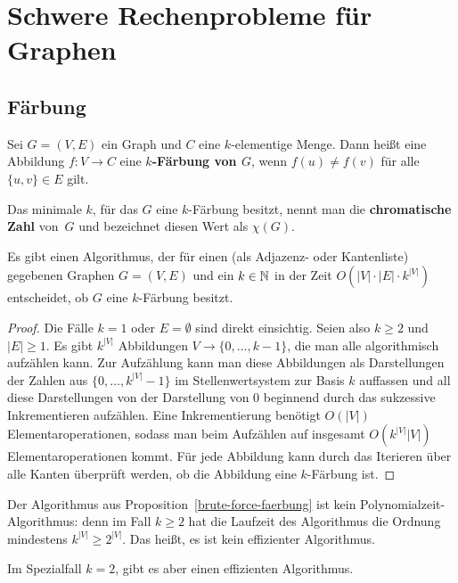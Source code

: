 \section{Schwere Rechenprobleme für Graphen} 

\subsection{Färbung} 

\begin{defn}
	Sei $G = (V,E)$ ein Graph und $C$ eine $k$-elementige Menge.
	Dann heißt eine Abbildung $ f : V\to C$ eine \textbf{$k$-Färbung von $G$}, wenn $f(u) \ne f(v)$ für alle $\{u,v\} \in E$ gilt. 
	
	Das minimale $k$, für das $G$ eine $k$-Färbung besitzt, nennt man die \textbf{chromatische Zahl} von~$G$ und bezeichnet diesen Wert als $\chi(G)$. 
\end{defn} 

\begin{prop} \label{brute-force-faerbung}
	Es gibt einen Algorithmus, der für einen (als Adjazenz- oder Kantenliste) gegebenen Graphen $G=(V,E)$ und ein $k \in \mathbb{N}$ in der Zeit $O(|V| \cdot |E| \cdot k^{|V|})$ entscheidet, ob $G$ eine $k$-Färbung besitzt. 
\end{prop} 
\begin{proof} 
	Die Fälle $k=1$ oder $E = \emptyset$ sind direkt einsichtig. 
	Seien also $k \ge 2$ und $|E| \geq 1$.
	Es gibt $k^{|V|}$ Abbildungen $V \to \{0,\ldots,k-1\}$, die man alle algorithmisch aufzählen kann. Zur Aufzählung kann man diese Abbildungen als Darstellungen der Zahlen aus $\{0,\ldots,k^{|V|} -1\}$ im Stellenwertsystem zur Basis $k$ auffassen und all diese Darstellungen von der Darstellung von $0$ beginnend durch das sukzessive Inkrementieren aufzählen. Eine Inkrementierung benötigt $O(|V|)$ Elementaroperationen, sodass man beim Aufzählen auf insgesamt $O(k^{|V|} |V|)$ Elementaroperationen kommt. Für jede Abbildung kann durch das Iterieren über alle Kanten überprüft werden, ob die Abbildung eine $k$-Färbung ist. 
\end{proof} 


\begin{bem}
	Der Algorithmus aus Proposition~\ref{brute-force-faerbung} ist kein Polynomialzeit-Algorithmus: denn im Fall $k \ge 2$ hat die Laufzeit des Algorithmus die Ordnung mindestens $
k^{|V|} \ge  2^{|V|}$. Das heißt, es ist kein effizienter Algorithmus. 
	
	Im Spezialfall $k=2$, gibt es aber einen effizienten Algorithmus.
\end{bem} 

